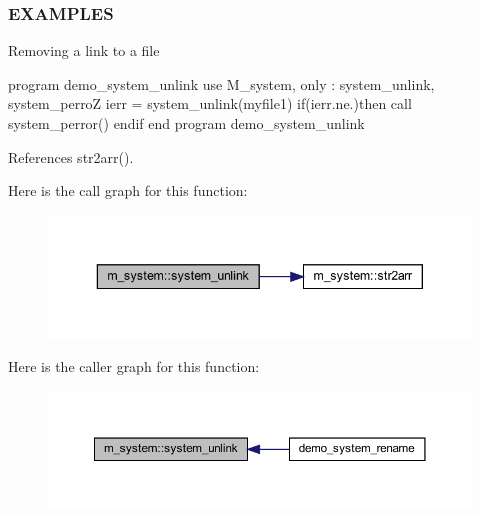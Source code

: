\subsubsection*{E\+X\+A\+M\+P\+L\+ES}

Removing a link to a file

program demo\+\_\+system\+\_\+unlink use M\+\_\+system, only \+: system\+\_\+unlink, system\+\_\+perroZ ierr = system\+\_\+unlink(\textquotesingle{}myfile1\textquotesingle{}) if(ierr.\+ne.)then call system\+\_\+perror(\textquotesingle{}) endif end program demo\+\_\+system\+\_\+unlink 

References str2arr().

Here is the call graph for this function\+:
\nopagebreak
\begin{figure}[H]
\begin{center}
\leavevmode
\includegraphics[width=343pt]{namespacem__system_a14ce0b9177815bc357dbdf3778687bb7_cgraph}
\end{center}
\end{figure}
Here is the caller graph for this function\+:
\nopagebreak
\begin{figure}[H]
\begin{center}
\leavevmode
\includegraphics[width=350pt]{namespacem__system_a14ce0b9177815bc357dbdf3778687bb7_icgraph}
\end{center}
\end{figure}
\mbox{\label{namespacem__system_a61b67b46b35490ec308773b65c3376a3}} 
